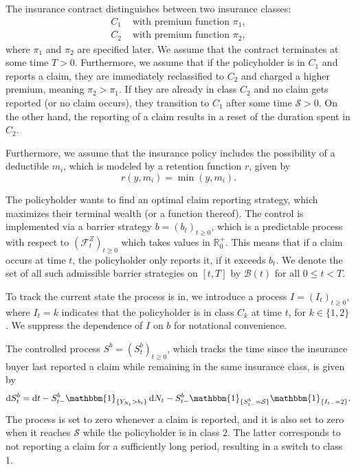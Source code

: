 \documentclass[a4paper]{scrartcl}
\theoremstyle{remark}
\theoremstyle{definition}
\numberwithin{equation}{section}
\newcommand*\diff{\mathop{}\!\mathrm{d}}
\newcommand{\ind}{\mathbbm{1}_}
\begin{document}
The insurance contract distinguishes between two insurance classes:
\[
\begin{aligned}
C_1 &\text{ with premium function } \pi_1, \\
C_2 &\text{ with premium function } \pi_2,
\end{aligned}
\]
where $\pi_1$ and $\pi_2$ are specified later. We assume that the contract terminates at some time $T>0$. 
Furthermore, we assume that if the policyholder is in $C_1$ and reports a claim, they are immediately reclassified to $C_2$ and charged a higher premium, meaning $\pi_2>\pi_1$. If they are already in class $C_2$ and no claim gets reported (or no claim occurs), they transition to $C_1$ after some time $\mathcal{S}>0$. On the other hand, the reporting of a claim results in a reset of the duration spent in $C_2$.

Furthermore, we assume that the insurance policy includes the possibility of a deductible $m_i$, which is modeled by a retention function $r$, given by 
\begin{equation*}
    r(y,m_i)=\min(y,m_i).
\end{equation*}

The policyholder wants to find an optimal claim reporting strategy, which maximizes their terminal wealth (or a function thereof). The control is implemented via a barrier strategy $b=(b_t)_{t\geq 0}$, which is a predictable process with respect to $( \mathcal{F}_t^Z )_{t \geq 0}$ which takes values in $\mathbb{R}^+_0$. This means that if a claim occurs at time $t$, the policyholder only reports it, if it exceeds $b_t$. We denote the set of all such admissible barrier strategies on $[t,T]$ by $\mathcal{B}(t)$ for all $0\leq t < T$. 

To track the current state the process is in, we introduce a process $I=(I_t)_{t \geq 0}$, where $I_t=k$ indicates that the policyholder is in class $C_k$ at time $t$, for $k \in \{1,2\}$. We suppress the dependence of $I$ on $b$ for notational convenience.

The controlled process $S^b=(S_t^b)_{t\geq 0}$, which tracks the time since the insurance buyer last reported a claim while remaining in the same insurance class, is given by
\begin{equation*}
\diff S_t^b=\diff t - S_{t-}^b \ind{\{Y_{N_t} > b_t\}}\diff N_t - S_{t-}^b \ind{\{S_{t-}^b=\mathcal{S}\}} \ind{\{I_{t-}=2\}}.
\end{equation*} 
The process is set to zero whenever a claim is reported, and it is also set to zero when it reaches $\mathcal{S}$ while the policyholder is in class 2. The latter corresponds to not reporting a claim for a sufficiently long period, resulting in a switch to class 1.
\end{document}
